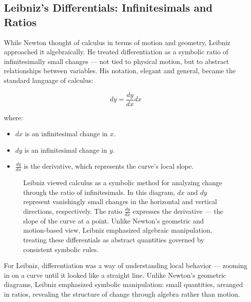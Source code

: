 \subsection{Leibniz’s Differentials: Infinitesimals and Ratios}  

While Newton thought of calculus in terms of motion and geometry, Leibniz approached it algebraically. He treated differentiation as a symbolic ratio of infinitesimally small changes — not tied to physical motion, but to abstract relationships between variables. His notation, elegant and general, became the standard language of calculus:

\[
dy = \frac{dy}{dx} dx
\]

where:  
\begin{itemize}
    \item \( dx \) is an infinitesimal change in \( x \).  
    \item \( dy \) is an infinitesimal change in \( y \).  
    \item \( \frac{dy}{dx} \) is the derivative, which represents the curve’s local slope.  
\end{itemize}  

\begin{figure}[H]
\centering
{}

\vspace{0.5em}
\caption{\small Leibniz viewed calculus as a symbolic method for analyzing change through the ratio of infinitesimals. In this diagram, $dx$ and $dy$ represent vanishingly small changes in the horizontal and vertical directions, respectively. The ratio $\frac{dy}{dx}$ expresses the derivative — the slope of the curve at a point. Unlike Newton's geometric and motion-based view, Leibniz emphasized algebraic manipulation, treating these differentials as abstract quantities governed by consistent symbolic rules.}
\end{figure}

For Leibniz, differentiation was a way of understanding local behavior — zooming in on a curve until it looked like a straight line. Unlike Newton’s geometric diagrams, Leibniz emphasized symbolic manipulation: small quantities, arranged in ratios, revealing the structure of change through algebra rather than motion.
